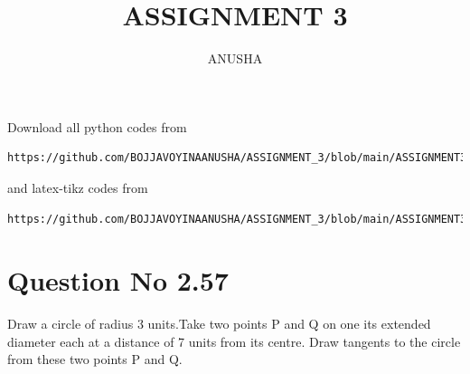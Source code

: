 \documentclass[journal,12pt,twocolumn]{IEEEtran}
\begin{document}
     \def\centbox#1{\makebox[0in]{#1}}
     \def\topbox#1{\raisebox{-\baselineskip}[0in][0in]{#1}}
     \def\midbox#1{\raisebox{-0.5\baselineskip}[0in][0in]{#1}}
\vspace{3cm}
\title{ASSIGNMENT 3}
\author{ANUSHA}
\maketitle
\newpage
\bigskip
\renewcommand{\thefigure}{\theenumi}
\renewcommand{\thetable}{\theenumi}
Download all python codes from 
\begin{lstlisting}
https://github.com/BOJJAVOYINAANUSHA/ASSIGNMENT_3/blob/main/ASSIGNMENT3/assignment3.py
\end{lstlisting}
%
and latex-tikz codes from 
%
\begin{lstlisting}
https://github.com/BOJJAVOYINAANUSHA/ASSIGNMENT_3/blob/main/ASSIGNMENT3/ASSIGNMENT3.tex
\end{lstlisting}
%
\section{Question No 2.57}
Draw a circle of radius 3 units.Take two points P and Q on one its extended diameter each at a distance of 7 units from its centre. Draw tangents to the circle from these two points P and Q. 
%
\end{document}
